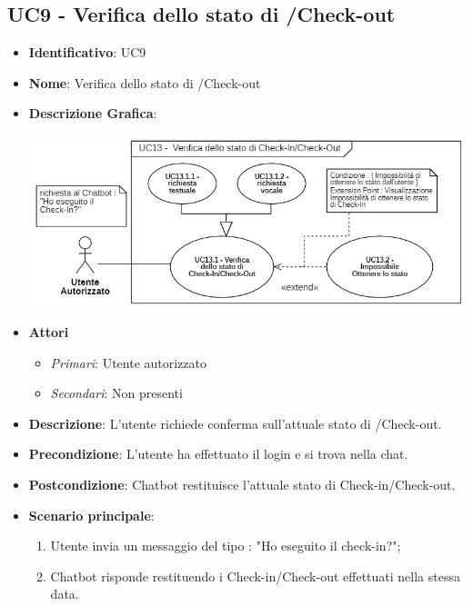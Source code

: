 \subsection{UC9 - Verifica dello stato di /Check-out}
\begin{itemize}
	\item \textbf{Identificativo}: UC9
	\item \textbf{Nome}: Verifica dello stato di /Check-out
	\item\textbf{Descrizione Grafica}: 
	\begin{center}
		\includegraphics[scale=0.65]{images/UC9.png} 
	\end{center}

	\item \textbf{Attori}
	\begin{itemize} 
		\item \textit{Primari}: Utente autorizzato
		\item \textit{Secondari}: Non presenti
	\end{itemize}
	\item \textbf{Descrizione}: L'utente richiede conferma sull'attuale stato di /Check-out.
	\item \textbf{Precondizione}: L'utente ha effettuato il login e si trova nella chat.
	\item \textbf{Postcondizione}: Chatbot restituisce l'attuale stato di Check-in/Check-out.
	\item \textbf{Scenario principale}:  \begin{enumerate}
		\item Utente invia un messaggio del tipo : "Ho eseguito il check-in?";
		\item Chatbot risponde restituendo i Check-in/Check-out effettuati nella stessa data.
	\end{enumerate}
\end{itemize}

